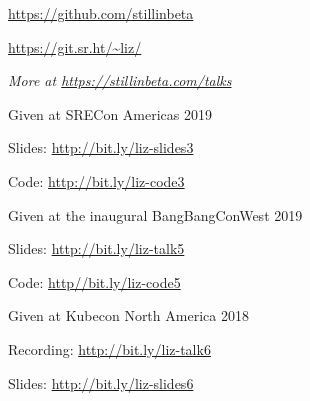 \documentclass[letterpaper,11pt,notitlepage]{article}
\begin{document}
        \begin{employment}
           \item \url{https://github.com/stillinbeta}
        \end{employment}
        \begin{employment}
           \item \url{https://git.sr.ht/~liz/}
        \end{employment}
\vbar
{}
      {\it More at \url{https://stillinbeta.com/talks}} \\
      \begin{employment}
          \item Given at SRECon Americas 2019
          \item Slides: \url{http://bit.ly/liz-slides3}
          \item Code: \url{http://bit.ly/liz-code3}
      \end{employment}
      \begin{employment}
        \item Given at the inaugural BangBangConWest 2019
        \item Slides: \url{http://bit.ly/liz-talk5}
        \item Code: \url{http//bit.ly/liz-code5}
      \end{employment}
      \begin{employment}
        \item Given at Kubecon North America 2018
        \item Recording: \url{http://bit.ly/liz-talk6}
        \item Slides: \url{http://bit.ly/liz-slides6}
      \end{employment}
\end{document}
